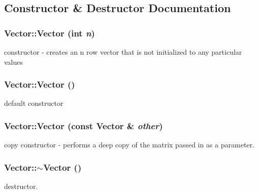\subsection{Constructor \& Destructor Documentation}
\hypertarget{classCartWheel_1_1Math_1_1Vector_a96908fb25f0e8236d25650847ee504d5}{
\subsubsection[{Vector}]{\setlength{\rightskip}{0pt plus 5cm}Vector::Vector (int {\em n})}}
\label{classCartWheel_1_1Math_1_1Vector_a96908fb25f0e8236d25650847ee504d5}
constructor -\/ creates an n row vector that is not initialized to any particular values \hypertarget{classCartWheel_1_1Math_1_1Vector_a6f80c73b5f18dcf3f8e36065bdc8b9e5}{
\subsubsection[{Vector}]{\setlength{\rightskip}{0pt plus 5cm}Vector::Vector ()}}
\label{classCartWheel_1_1Math_1_1Vector_a6f80c73b5f18dcf3f8e36065bdc8b9e5}
default constructor \hypertarget{classCartWheel_1_1Math_1_1Vector_a4ec1206fa568aa953588ef663ff511be}{
\subsubsection[{Vector}]{\setlength{\rightskip}{0pt plus 5cm}Vector::Vector (const {\bf Vector} \& {\em other})}}
\label{classCartWheel_1_1Math_1_1Vector_a4ec1206fa568aa953588ef663ff511be}
copy constructor -\/ performs a deep copy of the matrix passed in as a parameter. \hypertarget{classCartWheel_1_1Math_1_1Vector_a2eb3c49587a4f12cade7895ccb73f6a0}{
\subsubsection[{$\sim$Vector}]{\setlength{\rightskip}{0pt plus 5cm}Vector::$\sim$Vector ()}}
\label{classCartWheel_1_1Math_1_1Vector_a2eb3c49587a4f12cade7895ccb73f6a0}
destructor. 

